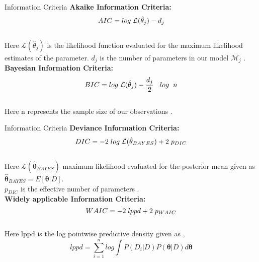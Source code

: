 \documentclass[t, aspectratio=169]{beamer}
\begin{document}
 

 \begin{frame}{Information Criteria}
 \vspace{1cm}
 \textbf{Akaike Information Criteria:}\\
\[AIC = log \hspace{0.1cm}\mathcal{L}(\hat{\mathbf{\theta}}_j) - d_j\]\\
\vspace{0.5cm}
Here \(\mathcal{L}(\hat{\theta}_j)\) is the likelihood function evaluated for the maximum likelihood estimates of the parameter. \(d_j\) is the number of parameters in our model \(\mathcal{M}_j\) \cite{Wasserman}.
\\
 \vspace{1cm}
 \textbf{Bayesian Information Criteria:}\\
\[BIC = log \hspace{0.1cm}\mathcal{L}(\hat{\mathbf{\theta}}_j) - \frac{d_j}{2}\hspace{0.3cm}log \hspace{0.2cm} n\]\\
\vspace{0.5cm}
Here n represents the sample size of our observations \cite{Wasserman}.

 \end{frame} 
 
 


 \begin{frame}{Information Criteria}
 \vspace{0.7cm}
 \textbf{Deviance Information Criteria:}
\[DIC = -2\hspace{0.1cm}log\hspace{0.1cm} \mathcal{L}(\hat{\mathbf{\theta}}_{BAYES}) + 2\hspace{0.1cm}p_{DIC}\]\\
\vspace{0.5cm}
Here \(\mathcal{L}(\hat{\mathbf{\theta}}_{BAYES})\) maximum likelihood evaluated for the posterior mean given as \(\hat{\mathbf{\theta}}_{BAYES} = E[\mathbf{\theta}|D]\). \\\(p_{DIC}\) is the effective number of parameters \cite{Gelman}.\\
\vspace{0.3cm}
 \textbf{Widely applicable Information Criteria:}\\
\[WAIC = -2\hspace{0.1cm}lppd + 2\hspace{0.1cm}p_{WAIC}\]\\
\vspace{0.5cm}
Here lppd is the log pointwise predictive density given as \cite{Gelman}, 
\[lppd = \sum_{i = 1}^n log \int P(D_i|D) P(\mathbf{\theta}|D) d\mathbf{\theta}\]\\

 \end{frame} 
 
\end{document}
